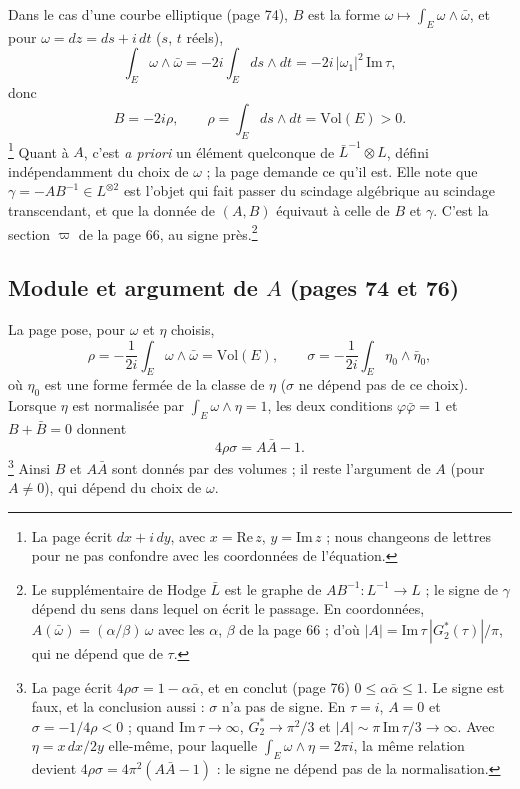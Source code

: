 \documentclass[11pt,a4paper]{article}
\begin{document}
Dans le cas d'une courbe elliptique (page 74), $B$ est la forme
$\omega \mapsto \int_E \omega\wedge\bar\omega$, et pour $\omega = dz =
ds + i\,dt$ ($s$, $t$ réels),
\[
\int_E \omega\wedge\bar\omega = -2i\int_E ds\wedge dt
= -2i\,|\omega_1|^2\,\mathrm{Im}\,\tau,
\]
donc
\[
B = -2i\rho,\qquad \rho = \int_E ds\wedge dt = \mathrm{Vol}(E) > 0 .
\]
\footnote{La page écrit $dx + i\,dy$, avec $x = \mathrm{Re}\,z$, $y =
\mathrm{Im}\,z$ ; nous changeons de lettres pour ne pas confondre avec les
coordonnées de l'équation.}
Quant à $A$, c'est \emph{a priori} un élément quelconque de $\bar L^{-1}\otimes
L$, défini indépendamment du choix de $\omega$ ; la page demande ce qu'il est.
Elle note que $\gamma = -AB^{-1} \in L^{\otimes 2}$ est l'objet qui fait passer
du scindage algébrique au scindage transcendant, et que la donnée de $(A,B)$
équivaut à celle de $B$ et $\gamma$. C'est la section $\varpi$ de la page 66,
au signe près.\footnote{Le supplémentaire de Hodge $\bar L$ est le graphe de
$AB^{-1}\colon L^{-1} \to L$ ; le signe de $\gamma$ dépend du sens dans
lequel on écrit le passage. En coordonnées, $A(\bar\omega) =
(\alpha/\beta)\,\omega$ avec les $\alpha$, $\beta$ de la page 66 ; d'où
$|A| = \mathrm{Im}\,\tau\,|G_2^*(\tau)|/\pi$, qui ne dépend que de $\tau$.}

\subsection*{Module et argument de $A$ (pages 74 et 76)}

La page pose, pour $\omega$ et $\eta$ choisis,
\[
\rho = -\frac{1}{2i}\int_E \omega\wedge\bar\omega = \mathrm{Vol}(E), \qquad
\sigma = -\frac{1}{2i}\int_E \eta_0\wedge\bar\eta_0,
\]
où $\eta_0$ est une forme fermée de la classe de $\eta$ ($\sigma$ ne dépend pas
de ce choix). Lorsque $\eta$ est normalisée par $\int_E \omega\wedge\eta = 1$,
les deux conditions $\varphi\bar\varphi = 1$ et $B + \bar B = 0$ donnent
\[
4\rho\sigma = A\bar A - 1 .
\]
\footnote{La page écrit $4\rho\sigma = 1 - \alpha\bar\alpha$, et en conclut
(page 76) $0 \leq \alpha\bar\alpha \leq 1$. Le signe est faux, et la
conclusion aussi : $\sigma$ n'a pas de signe. En $\tau = i$, $A = 0$ et $\sigma
= -1/4\rho < 0$ ; quand $\mathrm{Im}\,\tau \to \infty$, $G_2^* \to \pi^2/3$ et
$|A| \sim \pi\,\mathrm{Im}\,\tau/3 \to \infty$. Avec $\eta = x\,dx/2y$
elle-même, pour laquelle $\int_E\omega\wedge\eta = 2\pi i$, la même relation
devient $4\rho\sigma = 4\pi^2(A\bar A - 1)$ : le signe ne dépend pas de la
normalisation.} Ainsi $B$ et $A\bar A$ sont donnés par des volumes ; il reste
l'argument de $A$ (pour $A \neq 0$), qui dépend du choix de $\omega$.
\end{document}
